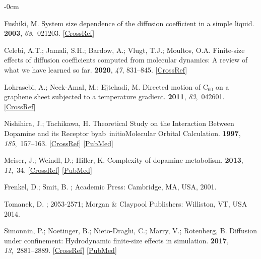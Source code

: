 \documentclass[molecules,article,accept,pdftex,moreauthors]{Definitions/mdpi}
\begin{document}
\begin{adjustwidth}{-\extralength}{0cm}
\begin{thebibliography}{999}
Fushiki, M.
\newblock System size dependence of the diffusion coefficient in a simple
liquid.
 {\bf 2003}, {\em 68},~021203. [\href{http://dx.doi.org/10.1103/PhysRevE.68.021203}{CrossRef}]

Celebi, A.T.; Jamali, S.H.; Bardow, A.; Vlugt, T.J.; Moultos, O.A.
\newblock Finite-size effects of diffusion coefficients computed from molecular
dynamics: A review of what we have learned so far.
 {\bf 2020}, \emph{47}, 831--845. [\href{http://dx.doi.org/10.1080/08927022.2020.1810685}{CrossRef}]

Lohrasebi, A.; Neek-Amal, M.; Ejtehadi, M.
\newblock Directed motion of ${\mathrm{C}}_{60}$ on a graphene sheet subjected
to a temperature gradient.
 {\bf 2011}, {\em 83},~042601. [\href{http://dx.doi.org/10.1103/PhysRevE.83.042601}{CrossRef}]

Nishihira, J.; Tachikawa, H.
\newblock Theoretical Study on the Interaction Between Dopamine and its
Receptor byab~initioMolecular Orbital Calculation.
 {\bf 1997}, {\em 185},~157--163. [\href{http://dx.doi.org/10.1006/jtbi.1996.0262}{CrossRef}] [\href{http://www.ncbi.nlm.nih.gov/pubmed/9135800}{PubMed}]

Meiser, J.; Weindl, D.; Hiller, K.
\newblock Complexity of dopamine metabolism.
 {\bf 2013}, {\em 11},~34. [\href{http://dx.doi.org/10.1186/1478-811X-11-34}{CrossRef}] [\href{http://www.ncbi.nlm.nih.gov/pubmed/23683503}{PubMed}]


Frenkel, D.; Smit, B.
; Academic Press: Cambridge, MA, USA, 2001.


Tomanek, D.
; 2053-2571; Morgan \& Claypool Publishers: Williston, VT, USA 
2014.



Simonnin, P.; Noetinger, B.; Nieto-Draghi, C.; Marry, V.; Rotenberg, B.
\newblock Diffusion under confinement: Hydrodynamic finite-size effects in
simulation.
 {\bf 2017}, {\em 13},~2881--2889. [\href{http://dx.doi.org/10.1021/acs.jctc.7b00342}{CrossRef}] [\href{http://www.ncbi.nlm.nih.gov/pubmed/28535342}{PubMed}]


\end{thebibliography}
\end{adjustwidth}
\end{document}
